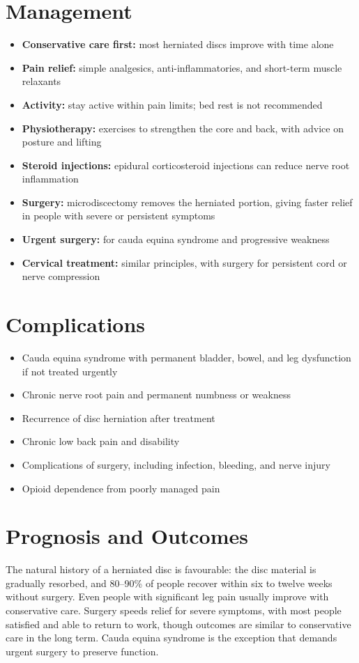 \section*{Management}
\begin{itemize}
    \item \textbf{Conservative care first:} most herniated discs improve with time alone
    \item \textbf{Pain relief:} simple analgesics, anti-inflammatories, and short-term muscle relaxants
    \item \textbf{Activity:} stay active within pain limits; bed rest is not recommended
    \item \textbf{Physiotherapy:} exercises to strengthen the core and back, with advice on posture and lifting
    \item \textbf{Steroid injections:} epidural corticosteroid injections can reduce nerve root inflammation
    \item \textbf{Surgery:} microdiscectomy removes the herniated portion, giving faster relief in people with severe or persistent symptoms
    \item \textbf{Urgent surgery:} for cauda equina syndrome and progressive weakness
    \item \textbf{Cervical treatment:} similar principles, with surgery for persistent cord or nerve compression
\end{itemize}

\section*{Complications}
\begin{itemize}
    \item Cauda equina syndrome with permanent bladder, bowel, and leg dysfunction if not treated urgently
    \item Chronic nerve root pain and permanent numbness or weakness
    \item Recurrence of disc herniation after treatment
    \item Chronic low back pain and disability
    \item Complications of surgery, including infection, bleeding, and nerve injury
    \item Opioid dependence from poorly managed pain
\end{itemize}

\section*{Prognosis and Outcomes}
The natural history of a herniated disc is favourable: the disc material is gradually resorbed, and 80--90\% of people recover within six to twelve weeks without surgery. Even people with significant leg pain usually improve with conservative care. Surgery speeds relief for severe symptoms, with most people satisfied and able to return to work, though outcomes are similar to conservative care in the long term. Cauda equina syndrome is the exception that demands urgent surgery to preserve function.

